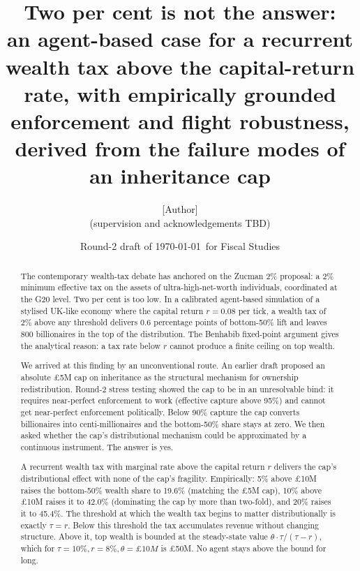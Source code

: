 \documentclass[11pt]{article}
\title{Two per cent is not the answer:\\
\large an agent-based case for a recurrent wealth tax above the
capital-return rate, with empirically grounded enforcement and
flight robustness, derived from the failure modes of an inheritance
cap}
\author{[Author]\\
\small (supervision and acknowledgements TBD)}
\date{Round-2 draft of \today\ for Fiscal Studies}
\begin{document}
\maketitle

\begin{abstract}
The contemporary wealth-tax debate has anchored on the Zucman 2\%
proposal: a 2\% minimum effective tax on the assets of
ultra-high-net-worth individuals, coordinated at the G20 level.  Two
per cent is too low.  In a calibrated agent-based simulation of a
stylised UK-like economy where the capital return $r = 0.08$ per
tick, a wealth tax of 2\% above any threshold delivers 0.6
percentage points of bottom-50\% lift and leaves 800 billionaires
in the top of the distribution.  The Benhabib fixed-point argument
gives the analytical reason: a tax rate below $r$ cannot produce a
finite ceiling on top wealth.

We arrived at this finding by an unconventional route.  An earlier
draft proposed an absolute \pounds 5M cap on inheritance as the
structural mechanism for ownership redistribution.  Round-2 stress
testing showed the cap to be in an unresolvable bind: it requires
near-perfect enforcement to work (effective capture above 95\%) and
cannot get near-perfect enforcement politically.  Below 90\% capture
the cap converts billionaires into centi-millionaires and the
bottom-50\% share stays at zero.  We then asked whether the cap's
distributional mechanism could be approximated by a continuous
instrument.  The answer is yes.

A recurrent wealth tax with marginal rate above the capital return
$r$ delivers the cap's distributional effect with none of the cap's
fragility.  Empirically: 5\% above \pounds 10M raises the
bottom-50\% wealth share to 19.6\% (matching the \pounds 5M cap),
10\% above \pounds 10M raises it to 42.0\% (dominating the cap by
more than two-fold), and 20\% raises it to 45.4\%.  The threshold
at which the wealth tax begins to matter distributionally is
exactly $\tau = r$.  Below this threshold the tax accumulates
revenue without changing structure.  Above it, top wealth is bounded
at the steady-state value $\theta \cdot \tau / (\tau - r)$, which
for $\tau = 10\%, r = 8\%, \theta = \pounds 10M$ is \pounds 50M.
No agent stays above the bound for long.


\end{abstract}
\end{document}
